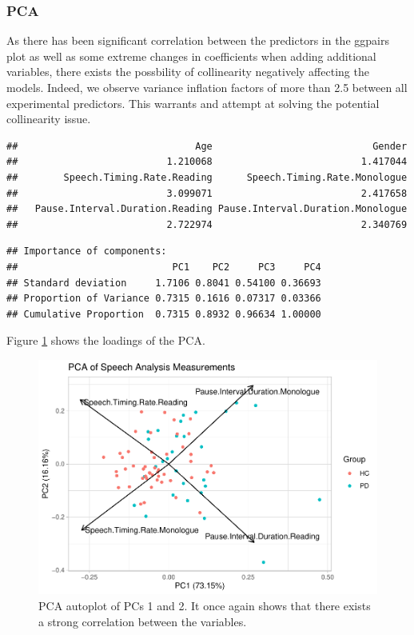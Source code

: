 \documentclass[
  english,
  doc,floatsintext]{apa6}
\begin{document}
\hypertarget{pca}{%
\subsubsection{PCA}\label{pca}}

As there has been significant correlation between the predictors in the ggpairs plot
as well as some extreme changes in coefficients when adding additional variables,
there exists the possbility of collinearity negatively affecting the models. Indeed,
we observe variance inflation factors of more than 2.5 between all experimental predictors.
This warrants and attempt at solving the potential collinearity issue.

\begin{verbatim}
##                               Age                            Gender 
##                          1.210068                          1.417044 
##        Speech.Timing.Rate.Reading      Speech.Timing.Rate.Monologue 
##                          3.099071                          2.417658 
##   Pause.Interval.Duration.Reading Pause.Interval.Duration.Monologue 
##                          2.722974                          2.340769
\end{verbatim}

\begin{verbatim}
## Importance of components:
##                           PC1    PC2     PC3     PC4
## Standard deviation     1.7106 0.8041 0.54100 0.36693
## Proportion of Variance 0.7315 0.1616 0.07317 0.03366
## Cumulative Proportion  0.7315 0.8932 0.96634 1.00000
\end{verbatim}

Figure \ref{fig:pca-loadings} shows the loadings of the PCA.

\begin{figure}

{\centering \includegraphics{dap_report_anja_probst_files/figure-latex/pca-loadings-1} 

}

\caption{PCA autoplot of PCs 1 and 2. It once again shows that there exists a strong correlation between the variables.}\label{fig:pca-loadings}
\end{figure}
\end{document}
